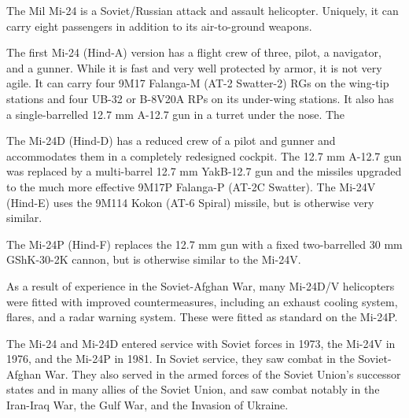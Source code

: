 

The Mil Mi-24 is a Soviet/Russian attack and assault helicopter. Uniquely, it can carry eight passengers in addition to its air-to-ground weapons.

The first Mi-24 (Hind-A) version has a flight crew of three, pilot, a navigator, and a gunner. While it is fast and very well protected by armor, it is not very agile. It can carry four 9M17 Falanga-M (AT-2 Swatter-2) RGs on the wing-tip stations and four UB-32  or B-8V20A  RPs on its under-wing stations. It also has a single-barrelled 12.7 mm A-12.7 gun in a turret under the nose. The

The Mi-24D (Hind-D) has a reduced crew of a pilot and gunner and accommodates them in a completely redesigned cockpit. The 12.7 mm A-12.7 gun was replaced by a multi-barrel 12.7 mm YakB-12.7 gun and the missiles upgraded to the much more effective 9M17P Falanga-P (AT-2C Swatter). The Mi-24V (Hind-E) uses the 9M114 Kokon (AT-6 Spiral) missile, but is otherwise very similar.

The Mi-24P (Hind-F) replaces the 12.7 mm gun with a fixed two-barrelled 30 mm GShK-30-2K cannon, but is otherwise similar to the Mi-24V.

As a result of experience in the Soviet-Afghan War, many Mi-24D/V helicopters were fitted with improved countermeasures, including an exhaust cooling system, flares, and a radar warning system. These were fitted as standard on the Mi-24P.

The Mi-24 and Mi-24D entered service with Soviet forces in 1973, the Mi-24V in 1976, and the Mi-24P in 1981. In Soviet service, they saw combat in the Soviet-Afghan War. They also served in the armed forces of the Soviet Union's successor states and in many allies of the Soviet Union, and saw combat notably in the Iran-Iraq War, the Gulf War, and the Invasion of Ukraine.
